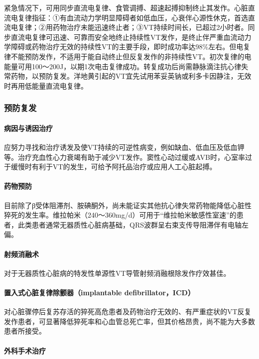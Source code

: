 紧急情况下，可用同步直流电复律、食管调搏、超速起搏抑制终止其发作。心脏直流电复律指征：①有血流动力学明显障碍者如低血压，心衰伴心源性休克，首选直流电复律；②用药物治疗未能迅速终止者；③VT持续时间长，已超过2小时者。同步直流电复律可迅速、可靠而安全地终止持续性VT发作，是终止伴严重血流动力学障碍或药物治疗无效的持续性VT的主要手段，即时成功率达98\%左右。但电复律不能预防发作，不适用于能自动终止但反复发作的非持续性VT。初次复律的电能量可用100～200J，以期1次电击复律成功。转复成功后尚需静脉滴注抗心律失常药物，以预防复发。洋地黄引起的VT宜先试用苯妥英钠或利多卡因静注，无效时再用低能量直流电复律。

\subsubsection{预防复发}

\paragraph{病因与诱因治疗}

应努力寻找和治疗诱发及使VT持续的可逆性病变，例如缺血、低血压及低血钾等。治疗充血性心力衰竭有助于减少VT发作。窦性心动过缓或AVB时，心室率过于缓慢时有利于VT的发生，可给予阿托品治疗或应用人工心脏起搏。

\paragraph{药物预防}

目前除了β受体阻滞剂、胺碘酮外，尚未能证实其他抗心律失常药物能降低心脏性猝死的发生率。维拉帕米（240～360mg/d）可用于“维拉帕米敏感性室速”的患者，此类患者通常无器质性心脏病基础，QRS波群呈右束支传导阻滞伴有电轴左偏。

\paragraph{射频消融术}

对于无器质性心脏病的特发性单源性VT导管射频消融根除发作疗效甚佳。

\paragraph{置入式心脏复律除颤器（implantable defibrillator，ICD）}

对心脏骤停后复苏存活的猝死高危患者及药物治疗无效的、有严重症状的VT反复发作患者，可显著降低猝死率和心血管总死亡率，但其价格昂贵，尚不能为大多数患者所接受。

\paragraph{外科手术治疗}

